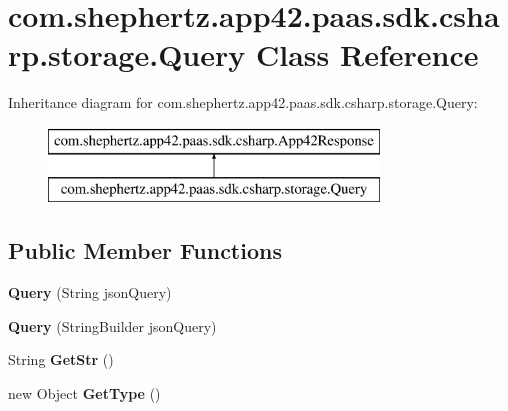 \hypertarget{classcom_1_1shephertz_1_1app42_1_1paas_1_1sdk_1_1csharp_1_1storage_1_1_query}{\section{com.\+shephertz.\+app42.\+paas.\+sdk.\+csharp.\+storage.\+Query Class Reference}
\label{classcom_1_1shephertz_1_1app42_1_1paas_1_1sdk_1_1csharp_1_1storage_1_1_query}
}
Inheritance diagram for com.\+shephertz.\+app42.\+paas.\+sdk.\+csharp.\+storage.\+Query\+:\begin{figure}[H]
\begin{center}
\leavevmode
\includegraphics[height=2.000000cm]{classcom_1_1shephertz_1_1app42_1_1paas_1_1sdk_1_1csharp_1_1storage_1_1_query}
\end{center}
\end{figure}
\subsection*{Public Member Functions}
\begin{DoxyCompactItemize}
\item 
\hypertarget{classcom_1_1shephertz_1_1app42_1_1paas_1_1sdk_1_1csharp_1_1storage_1_1_query_a16a8120cbaddb700fa6a1ea323bfb944}{{\bfseries Query} (String json\+Query)}\label{classcom_1_1shephertz_1_1app42_1_1paas_1_1sdk_1_1csharp_1_1storage_1_1_query_a16a8120cbaddb700fa6a1ea323bfb944}

\item 
\hypertarget{classcom_1_1shephertz_1_1app42_1_1paas_1_1sdk_1_1csharp_1_1storage_1_1_query_a08e32616f18077533341afe7d4c951aa}{{\bfseries Query} (String\+Builder json\+Query)}\label{classcom_1_1shephertz_1_1app42_1_1paas_1_1sdk_1_1csharp_1_1storage_1_1_query_a08e32616f18077533341afe7d4c951aa}

\item 
\hypertarget{classcom_1_1shephertz_1_1app42_1_1paas_1_1sdk_1_1csharp_1_1storage_1_1_query_a81ba7ecb379b3597850276ae6552f8b4}{String {\bfseries Get\+Str} ()}\label{classcom_1_1shephertz_1_1app42_1_1paas_1_1sdk_1_1csharp_1_1storage_1_1_query_a81ba7ecb379b3597850276ae6552f8b4}

\item 
\hypertarget{classcom_1_1shephertz_1_1app42_1_1paas_1_1sdk_1_1csharp_1_1storage_1_1_query_a1cad7741299cc77950bc02eb684ff6d9}{new Object {\bfseries Get\+Type} ()}\label{classcom_1_1shephertz_1_1app42_1_1paas_1_1sdk_1_1csharp_1_1storage_1_1_query_a1cad7741299cc77950bc02eb684ff6d9}

\end{DoxyCompactItemize}
